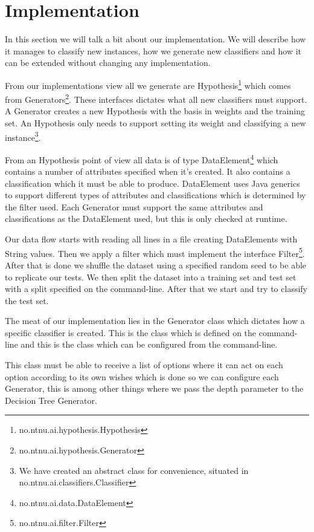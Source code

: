\section{Implementation}\label{implementation}
In this section we will talk a bit about our implementation. We will describe
how it manages to classify new instances, how we generate new classifiers and
how it can be extended without changing any implementation.

From our \adaboost{} implementations view all we generate are Hypothesis\footnote{
no.ntnu.ai.hypothesis.Hypothesis} which comes from Generators\footnote{
no.ntnu.ai.hypothesis.Generator}. These interfaces dictates what all new
classifiers must support. A Generator creates a new Hypothesis with the basis
in weights and the training set. An Hypothesis only needs to support setting
its weight and classifying a new instance\footnote{We have created an abstract
class for convenience, situated in no.ntnu.ai.classifiers.Classifier}.

From an Hypothesis point of view all data is of type DataElement\footnote{
no.ntnu.ai.data.DataElement} which contains a number of attributes specified when
it's created. It also contains a classification which it must be able to produce.
DataElement uses Java generics to support different types of attributes and 
classifications which is determined by the filter used. Each Generator must
support the same attributes and classifications as the DataElement used, but
this is only checked at runtime.

Our data flow starts with reading all lines in a file creating DataElements
with String values. Then we apply a filter which must implement the interface
Filter\footnote{no.ntnu.ai.filter.Filter}. After that is done we shuffle the
dataset using a specified random seed to be able to replicate our tests. We
then split the dataset into a training set and test set with a split specified
on the command-line. After that we start \adaboost{} and try to classify the
test set.

The meat of our implementation lies in the Generator class which dictates how
a specific classifier is created. This is the class which is defined on the
command-line and this is the class which can be configured from the command-line.

This class must be able to receive a list of options where it can act on each
option according to its own wishes which is done so we can configure each Generator,
this is among other things where we pass the depth parameter to the Decision Tree
Generator.

